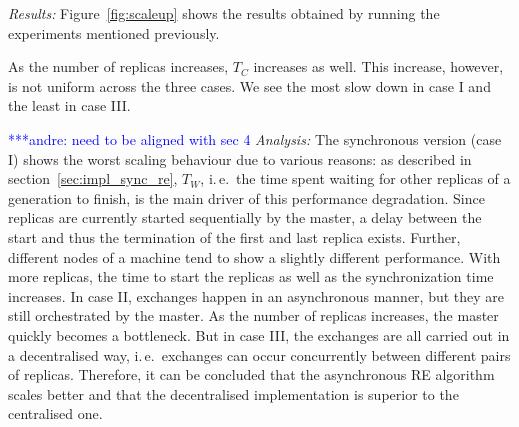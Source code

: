 \documentclass{rspublic}
\newcommand{\alnote}[1]{ {\textcolor{blue} { ***andre: #1 }}}
\newcommand{\alnote}[1]{}
\begin{document}
{%

{\it Results:} Figure~\ref{fig:scaleup} shows the results obtained by running the 
experiments mentioned previously. 



As the number of replicas increases, $T_{C}$ increases 
as well. This increase, however, is not uniform across the three cases. 
We see the most slow down in case I and the least in case III.

\alnote{need to be aligned with sec 4}
{\it Analysis: } The synchronous version (case I) shows the
worst scaling behaviour due to various reasons: as described in section~\ref{sec:impl_sync_re},
$T_{W}$, i.\,e.\ the time spent waiting for other replicas of a generation to finish,
is the main driver of this performance degradation. Since replicas are currently started
sequentially by the master, a delay between the start and thus the termination of the first and 
last replica exists. Further, different nodes of a machine tend to show a slightly 
different performance. With more replicas, the time to start the replicas as well as the
synchronization time increases.  In case II, exchanges happen in
an asynchronous manner, but they are still orchestrated by the master. 
As the number of replicas increases, the master quickly becomes
a bottleneck. But in case III, the exchanges are all carried out in a
decentralised way, i.\,e.\ exchanges can occur concurrently between 
different pairs of replicas. Therefore, it can be concluded that the asynchronous
RE algorithm scales better and that the decentralised implementation
is superior to the centralised one.

}
\end{document}
